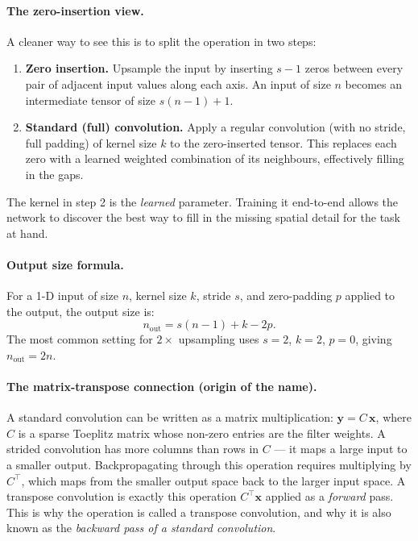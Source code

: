\documentclass[11pt,a4paper]{article}
\begin{document}
\paragraph{The zero-insertion view.}
A cleaner way to see this is to split the operation in two steps:
\begin{enumerate}
  \item \textbf{Zero insertion.} Upsample the input by inserting $s-1$ zeros between every pair of adjacent input values along each axis. An input of size $n$ becomes an intermediate tensor of size $s(n-1)+1$.
  \item \textbf{Standard (full) convolution.} Apply a regular convolution (with no stride, full padding) of kernel size $k$ to the zero-inserted tensor. This replaces each zero with a learned weighted combination of its neighbours, effectively filling in the gaps.
\end{enumerate}
The kernel in step 2 is the \emph{learned} parameter. Training it end-to-end allows the network to discover the best way to fill in the missing spatial detail for the task at hand.

\paragraph{Output size formula.}
For a 1-D input of size $n$, kernel size $k$, stride $s$, and zero-padding $p$ applied to the output, the output size is:
\[
  n_\text{out} = s(n-1) + k - 2p.
\]
The most common setting for $2\times$ upsampling uses $s=2$, $k=2$, $p=0$, giving $n_\text{out} = 2n$.

\paragraph{The matrix-transpose connection (origin of the name).}
A standard convolution can be written as a matrix multiplication: $\mathbf{y} = C\,\mathbf{x}$, where $C$ is a sparse Toeplitz matrix whose non-zero entries are the filter weights. A strided convolution has more columns than rows in $C$ — it maps a large input to a smaller output. Backpropagating through this operation requires multiplying by $C^\top$, which maps from the smaller output space back to the larger input space. A transpose convolution is exactly this operation $C^\top\mathbf{x}$ applied as a \emph{forward} pass. This is why the operation is called a transpose convolution, and why it is also known as the \emph{backward pass of a standard convolution}.
\end{document}
